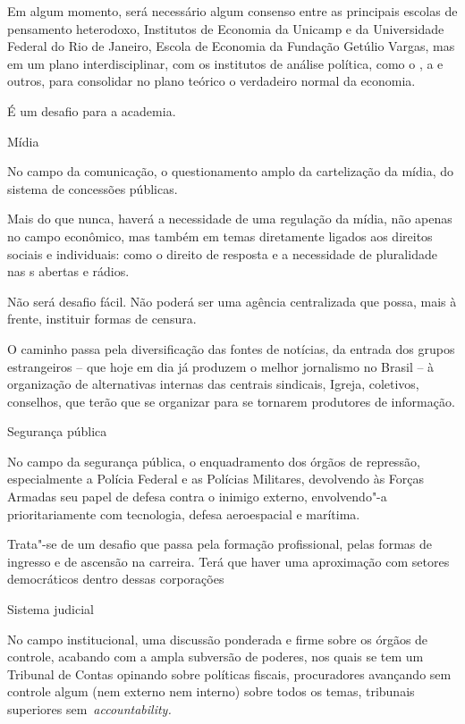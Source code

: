 Em algum momento, será necessário algum consenso entre as principais
escolas de pensamento heterodoxo, Institutos de Economia da Unicamp e da
Universidade Federal do Rio de Janeiro, Escola de Economia da Fundação
Getúlio Vargas, mas em um plano interdisciplinar, com os institutos de
análise política, como o , a  e outros, para consolidar no
plano teórico o verdadeiro normal da economia.

É um desafio para a academia.

Mídia

No campo da comunicação, o questionamento amplo da cartelização da
mídia, do sistema de concessões públicas.

Mais do que nunca, haverá a necessidade de uma regulação da mídia, não
apenas no campo econômico, mas também em temas diretamente ligados aos
direitos sociais e individuais: como o direito de resposta e a
necessidade de pluralidade nas s abertas e rádios.

Não será desafio fácil. Não poderá ser uma agência centralizada que
possa, mais à frente, instituir formas de censura.

O caminho passa pela diversificação das fontes de notícias, da entrada
dos grupos estrangeiros -- que hoje em dia já produzem o melhor
jornalismo no Brasil -- à organização de alternativas internas das
centrais sindicais, Igreja, coletivos, conselhos, que terão que se
organizar para se tornarem produtores de informação.

Segurança pública

No campo da segurança pública, o enquadramento dos órgãos de repressão,
especialmente a Polícia Federal e as Polícias Militares, devolvendo às
Forças Armadas seu papel de defesa contra o inimigo externo,
envolvendo"-a prioritariamente com tecnologia, defesa aeroespacial e
marítima.

Trata"-se de um desafio que passa pela formação profissional, pelas
formas de ingresso e de ascensão na carreira. Terá que haver uma
aproximação com setores democráticos dentro dessas corporações

Sistema judicial

No campo institucional, uma discussão ponderada e firme sobre os órgãos
de controle, acabando com a ampla subversão de poderes, nos quais se tem
um Tribunal de Contas opinando sobre políticas fiscais, procuradores
avançando sem controle algum (nem externo nem interno) sobre todos os
temas, tribunais superiores sem~\emph{accountability.}

